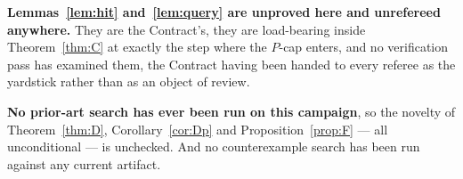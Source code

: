 \documentclass{aicr-solution}
\begin{document}
\smallskip
\noindent\textbf{Lemmas~\ref{lem:hit} and~\ref{lem:query} are unproved here and
unrefereed anywhere.} They are the Contract's, they are load-bearing inside
Theorem~\ref{thm:C} at exactly the step where the $P$-cap enters, and no
verification pass has examined them, the Contract having been handed to every
referee as the yardstick rather than as an object of review.

\smallskip
\noindent\textbf{No prior-art search has ever been run on this campaign}, so the
novelty of Theorem~\ref{thm:D}, Corollary~\ref{cor:Dp} and
Proposition~\ref{prop:F} --- all unconditional --- is unchecked. And no
counterexample search has been run against any current artifact.
\end{document}
